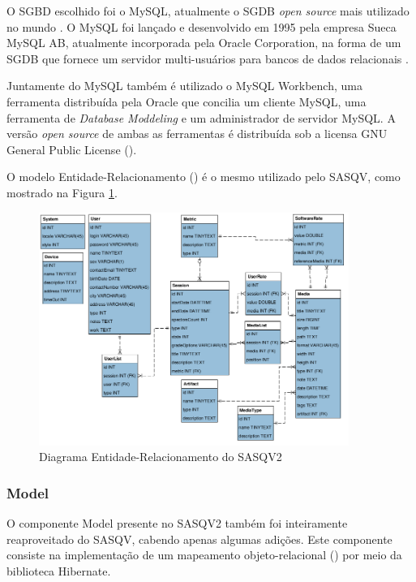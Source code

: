 O SGBD escolhido foi o MySQL, atualmente o SGDB \emph{open source} mais utilizado no mundo \cite{mysqlmarket}.
O MySQL foi lançado e desenvolvido em 1995 pela empresa Sueca MySQL AB, atualmente incorporada pela Oracle Corporation, na forma de um SGDB que fornece um servidor multi-usuários para bancos de dados relacionais \cite{wikipediamysql}.

Juntamente do MySQL também é utilizado o MySQL Workbench, uma ferramenta distribuída pela Oracle que concilia um cliente MySQL, uma ferramenta de \emph{Database Moddeling} e um administrador de servidor MySQL.
A versão \emph{open source} de ambas as ferramentas é distribuída sob a licensa GNU General Public License ().

O modelo Entidade-Relacionamento () é o mesmo utilizado pelo SASQV, como mostrado na Figura \ref{fig:diagramaER}.

\begin{figure}[!htb]
	\centering
	\includegraphics[width=0.9\textwidth]{./imgs/diagramaER.png}
	\caption{Diagrama Entidade-Relacionamento do SASQV2}
	\label{fig:diagramaER}
\end{figure}

\subsubsection{Model}

O componente Model presente no SASQV2 também foi inteiramente reaproveitado do SASQV, cabendo apenas algumas adições. Este componente consiste na implementação de um mapeamento objeto-relacional () por meio da biblioteca Hibernate.

